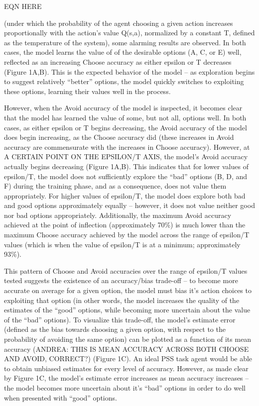 \documentclass[10pt,letterpaper]{article}
\begin{document}
	EQN HERE
	
(under which the probability of the agent choosing a given action increases proportionally with the action’s value Q(s,a), normalized by a constant T, defined as the temperature of the system), some alarming results are observed. In both cases, the model learns the value of of the desirable options (A, C, or E) well, reflected as an increasing Choose accuracy as either epsilon or T decreases (Figure 1A,B). This is the expected behavior of the model – as exploration begins to suggest relatively “better” options, the model quickly switches to exploiting these options, learning their values well in the process.

However, when the Avoid accuracy of the model is inspected, it becomes clear that the model has learned the value of some, but not all, options well. In both cases, as either epsilon or T begins decreasing, the Avoid accuracy of the model does begin increasing, as the Choose accuracy did (these increases in Avoid accuracy are commensurate with the increases in Choose accuracy). However, at A CERTAIN POINT ON THE EPSILON/T AXIS, the model’s Avoid accuracy actually begins decreasing (Figure 1A,B). This indicates that for lower values of epsilon/T, the model does not sufficiently explore the “bad” options (B, D, and F) during the training phase, and as a consequence, does not value them appropriately. For higher values of epsilon/T, the model does explore both bad and good options approximately equally – however, it does not value neither good nor bad options appropriately. Additionally, the maximum Avoid accuracy achieved at the point of inflection (approximately 70\%) is much lower than the maximum Choose accuracy achieved by the model across the range of epsilon/T values (which is when the value of epsilon/T is at a minimum; approximately 93\%). 

This pattern of Choose and Avoid accuracies over the range of epsilon/T values tested suggests the existence of an accuracy/bias trade-off – to become more accurate on average for a given option, the model must bias it’s action choices to exploiting that option (in other words, the model increases the quality of the estimates of the “good” options, while becoming more uncertain about the value of the “bad” options). To visualize this trade-off, the model’s estimate error (defined as the bias towards choosing a given option, with respect to the probability of avoiding the same option) can be plotted as a function of its mean accuracy (ANDREA: THIS IS MEAN ACCURACY ACROSS BOTH CHOOSE AND AVOID, CORRECT?) (Figure 1C). An ideal PSS task agent would be able to obtain unbiased estimates for every level of accuracy. However, as made clear by Figure 1C, the model’s estimate error increases as mean accuracy increases – the model becomes more uncertain about it’s “bad” options in order to do well when presented with “good” options.
	
\end{document}
